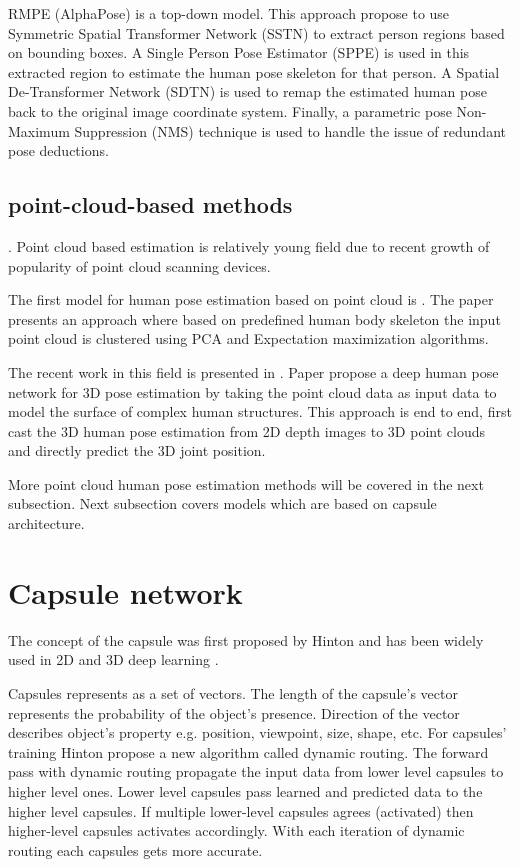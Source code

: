 RMPE (AlphaPose) \cite{fang_rmpe_2018} is a top-down model. This approach propose to use Symmetric Spatial Transformer Network (SSTN) to extract person regions based on bounding boxes. A Single Person Pose Estimator (SPPE) is used in this extracted region to estimate the human pose skeleton for that person. A Spatial De-Transformer Network (SDTN) is used to remap the estimated human pose back to the original image coordinate system. Finally, a parametric pose Non-Maximum Suppression (NMS) technique is used to handle the issue of redundant pose deductions.

\subsection{point-cloud-based methods}. Point cloud based estimation is relatively young field due to recent growth of popularity of point cloud scanning devices.

The first model for human pose estimation based on point cloud is \cite{diaz_barros_real-time_2015}. The paper presents an approach where based on predefined human body skeleton the input point cloud is clustered using PCA and Expectation maximization algorithms.

The recent work in this field is presented in \cite{zhou_learning_2020}. Paper propose a deep human pose network for 3D pose estimation by taking the point cloud data as input data to model the surface of complex human structures. This approach is end to end, first cast the 3D human pose estimation from 2D depth images to 3D point clouds and directly predict the 3D joint position.

More point cloud human pose estimation methods will be covered in the next subsection. Next subsection covers models which are based on capsule architecture.

\section{Capsule network}
The concept of the capsule was first proposed by Hinton \cite{sabour_dynamic_2017} and has been widely used in 2D and 3D deep learning \cite{kakillioglu_3d_2020, qin_detecting_2020, duarte_videocapsulenet_2018, lalonde_capsules_2018}.

Capsules represents as a set of vectors. The length of the capsule's vector represents the probability of the object's presence. Direction of the vector describes object's property e.g. position, viewpoint, size, shape, etc. For capsules' training Hinton propose a new algorithm \cite{sabour_dynamic_2017} called dynamic routing. The forward pass with dynamic routing propagate the input data from lower level capsules to higher level ones. Lower level capsules pass learned and predicted data to the higher level capsules. If multiple lower-level capsules agrees (activated) then higher-level capsules activates accordingly. With each iteration of dynamic routing each capsules gets more accurate.


